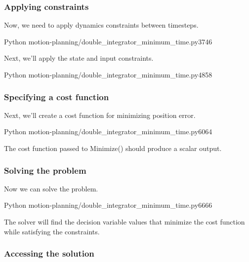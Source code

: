 \subsubsection{Applying constraints}

Now, we need to apply dynamics constraints between timesteps.
\begin{coderemotesubset}{Python}
  {motion-planning/double_integrator_minimum_time.py}{37}{46}
\end{coderemotesubset}

Next, we'll apply the state and input constraints.
\begin{coderemotesubset}{Python}
  {motion-planning/double_integrator_minimum_time.py}{48}{58}
\end{coderemotesubset}

\subsubsection{Specifying a cost function}

Next, we'll create a cost function for minimizing position error.
\begin{coderemotesubset}{Python}
  {motion-planning/double_integrator_minimum_time.py}{60}{64}
\end{coderemotesubset}

The cost function passed to Minimize() should produce a scalar output.

\subsubsection{Solving the problem}

Now we can solve the problem.
\begin{coderemotesubset}{Python}
  {motion-planning/double_integrator_minimum_time.py}{66}{66}
\end{coderemotesubset}

The solver will find the decision variable values that minimize the cost
function while satisfying the constraints.

\subsubsection{Accessing the solution}

